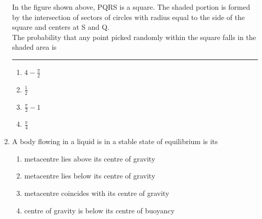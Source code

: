 \documentclass[journal]{IEEEtran}
\begin{document}
\begin{enumerate}
In the figure shown above, PQRS is a square. The shaded portion is formed by the intersection of sectors of circles with radius equal to the side of the square and centers at S and Q.\\
The probability that any point picked randomly within the square falls in the shaded area is \rule{1cm}{0.15mm}
\begin{multicols}{2}
    \begin{enumerate}
        \item $4- \frac{\pi}{2}$
        \item $\frac{1}{2}$
        \item $\frac{\pi}{2} - 1$
        \item $\frac{\pi}{4}$
    \end{enumerate}
\end{multicols}

\item A body flowing in a liquid is in a stable state of equilibrium is its
\begin{multicols}{2}
    \begin{enumerate}
        \item metacentre lies above its centre of gravity
        \item metacentre lies below its centre of gravity
        \item metacentre coincides with its centre of gravity
        \item centre of gravity is below its centre of buoyancy
    \end{enumerate}
\end{multicols}


\end{enumerate}
\end{document}
